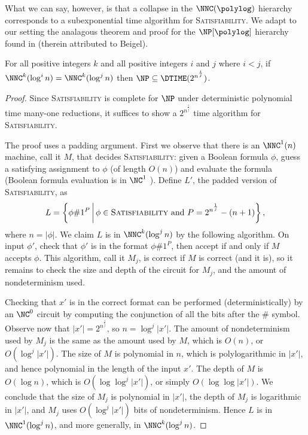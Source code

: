 \documentclass{article}
\begin{document}
What we can say, however, is that a collapse in the $\NNC(\polylog)$ hierarchy corresponds to a subexponential time algorithm for \textsc{Satisfiability}.
We adapt to our setting the analagous theorem and proof for the $\NP[\polylog]$ hierarchy found in \cite[Theorem~1]{dt90} (therein attributed to Beigel).
\begin{theorem}\label{thm:collapse}
  For all positive integers $k$ and all positive integers $i$ and $j$ where $i < j$, if $\NNC^k(\log^i n) = \NNC^k(\log^j n)$ then $\NP \subseteq \DTIME(2^{n^{\frac{i}{j}}})$.
\end{theorem}
\begin{proof}
  Since \textsc{Satisfiability} is complete for $\NP$ under deterministic polynomial time many-one reductions, it suffices to show a $2^{n^{\frac{i}{j}}}$ time algorithm for \textsc{Satisfiability}.

  The proof uses a padding argument.
  First we observe that there is an $\NNC^1(n)$ machine, call it $M$, that decides \textsc{Satisfiability}: given a Boolean formula $\phi$, guess a satisfying assignment to $\phi$ (of length $O(n)$) and evaluate the formula (Boolean formula evaluation is in $\NC^1$ \cite{buss87}).
  Define $L'$, the padded version of \textsc{Satisfiability}, as
  \begin{equation*}
    L = \left\{ \phi \# 1^P \, \middle| \, \phi \in \textsc{Satisfiability} \text{ and } P = 2^{n^\frac{1}{j}} - (n + 1) \right\},
  \end{equation*}
  where $n = |\phi|$.
  We claim $L$ is in $\NNC^k(\log^j n)$ by the following algorithm.
  On input $\phi'$, check that $\phi'$ is in the format $\phi \# 1^P$, then accept if and only if $M$ accepts $\phi$.
  This algorithm, call it $M_j$, is correct if $M$ is correct (and it is), so it remains to check the size and depth of the circuit for $M_j$, and the amount of nondeterminism used.

  Checking that $x'$ is in the correct format can be performed (deterministically) by an $\NC^0$ circuit by computing the conjunction of all the bits after the $\#$ symbol.
  Observe now that $|x'| = 2^{n^{\frac{1}{j}}}$, so $n = \log^j{|x'|}$.
  The amount of nondeterminism used by $M_j$ is the same as the amount used by $M$, which is $O(n)$, or $O(\log^j |x'|)$.
  The size of $M$ is polynomial in $n$, which is polylogarithmic in $|x'|$, and hence polynomial in the length of the input $x'$.
  The depth of $M$ is $O(\log n)$, which is $O(\log \log^j |x'|)$, or simply $O(\log \log |x'|)$.
  We conclude that the size of $M_j$ is polynomial in $|x'|$, the depth of $M_j$ is logarithmic in $|x'|$, and $M_j$ uses $O(\log^j |x'|)$ bits of nondeterminism.
  Hence $L$ is in $\NNC^1(\log^j n)$, and more generally, in $\NNC^k(\log^j n)$.


\end{proof}
\end{document}
